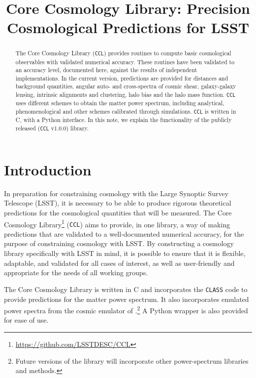 \documentclass[\docopts]{\docclass}
\newcommand{\ccl}{{\tt CCL}\xspace}
\begin{document}
\title{Core Cosmology Library: Precision Cosmological Predictions for LSST}

\maketitlepre

\begin{abstract}

The Core Cosmology Library (\ccl) provides routines to compute basic cosmological observables with validated numerical accuracy. These routines have been validated to an accuracy level, documented here, against the results of independent implementations. In the current version, predictions are provided for distances and background quantities, angular auto- and cross-spectra of cosmic shear, galaxy-galaxy lensing, intrinsic alignments and clustering, halo bias and the halo mass function. \ccl uses different schemes to obtain the matter power spectrum, including analytical, phenomenological and other schemes calibrated through simulations. \ccl is written in C, with a Python interface. In this note, we explain the functionality of the publicly released (\ccl v1.0.0) library.

\end{abstract}


\maketitlepost

\newpage
\tableofcontents{}
\newpage

\section{Introduction}
\label{sec:intro}

In preparation for constraining cosmology with the Large Synoptic Survey Telescope (LSST), it is necessary to be able to produce rigorous theoretical predictions for the cosmological quantities that will be measured. The Core Cosmology Library\footnote{\url{https://github.com/LSSTDESC/CCL}} (\ccl) aims to provide, in one library, a way of making predictions that are validated to a well-documented numerical accuracy, for the purpose of constraining cosmology with LSST. By constructing a cosmology library specifically with LSST in mind, it is possible to ensure that it is flexible, adaptable, and validated for all cases of interest, as well as user-friendly and appropriate for the needs of all working groups.

The Core Cosmology Library is written in C and incorporates the {\tt CLASS} code \citep{class} to provide predictions for the matter power spectrum. It also incorporates emulated power spectra from the cosmic emulator of \citet{Lawrence17}.\footnote{Future versions of the library will incorporate other power-spectrum libraries and methods.} A Python wrapper is also provided for ease of use.
\end{document}
